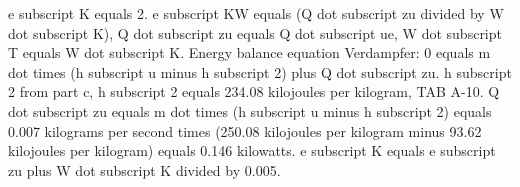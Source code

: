 e subscript K equals 2.
e subscript KW equals (Q dot subscript zu divided by W dot subscript K), Q dot subscript zu equals Q dot subscript ue, W dot subscript T equals W dot subscript K.
Energy balance equation Verdampfer: 0 equals m dot times (h subscript u minus h subscript 2) plus Q dot subscript zu.
h subscript 2 from part c, h subscript 2 equals 234.08 kilojoules per kilogram, TAB A-10.
Q dot subscript zu equals m dot times (h subscript u minus h subscript 2) equals 0.007 kilograms per second times (250.08 kilojoules per kilogram minus 93.62 kilojoules per kilogram) equals 0.146 kilowatts.
e subscript K equals e subscript zu plus W dot subscript K divided by 0.005.